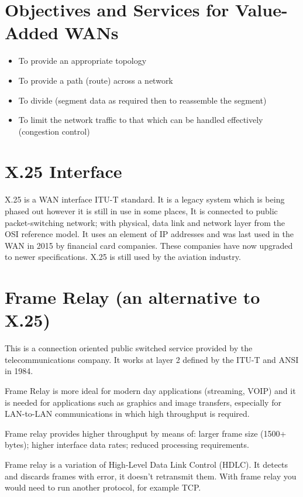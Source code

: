 \section*{Objectives and Services for Value-Added WANs}
\begin{itemize}
    \item To provide an appropriate topology
    \item To provide a path (route) across a network
    \item To divide (segment data as required then to reassemble the segment)
    \item To limit the network traffic to that which can be handled effectively (congestion control)
\end{itemize}

\section*{X.25 Interface}
X.25 is a WAN interface ITU-T standard. It is a legacy system which is being phased out however it is still in use in some places, It is connected to  public packet-switching network; with physical, data link and network layer from the OSI reference model. It uses an element of IP addresses and was last used in the WAN in 2015 by financial card companies. These companies have now upgraded to newer specifications. X.25 is still used by the aviation industry.

\section*{Frame Relay (an alternative to X.25)}
This is a connection oriented public switched service provided by the telecommunications company. It works at layer 2 defined by the ITU-T and ANSI in 1984.

Frame Relay is more ideal for modern day applications (streaming, VOIP) and it is needed for applications such as graphics and image transfers, especially for LAN-to-LAN communications in which high throughput is required.

Frame relay provides higher throughput by means of: larger frame size (1500+ bytes); higher interface data rates; reduced processing requirements.

Frame relay is a variation of High-Level Data Link Control (HDLC). It detects and discards frames with error, it doesn't retransmit them. With frame relay you would need to run another protocol, for example TCP.

